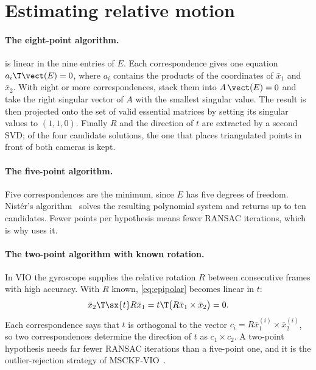 \section{Estimating relative motion}

\paragraph{The eight-point algorithm.}  is linear in the nine entries of $E$. Each correspondence gives
one equation $a_i\T\vect(E) = 0$, where $a_i$ contains the products of the coordinates of $\bar x_1$ and $\bar x_2$. With eight
or more correspondences, stack them into $A\,\vect(E) = 0$ and take the right singular vector of $A$ with the smallest
singular value. The result is then projected onto the set of valid essential matrices by setting its singular values
to $(1, 1, 0)$. Finally $R$ and the direction of $t$ are extracted by a second SVD; of the four candidate solutions, the
one that places triangulated points in front of both cameras is kept.

\paragraph{The five-point algorithm.} Five correspondences are the minimum, since $E$ has five degrees of freedom.
Nistér's algorithm~\cite{nister2004five} solves the resulting polynomial system and returns up to ten candidates. Fewer
points per hypothesis means fewer RANSAC iterations, which is why  uses it.

\paragraph{The two-point algorithm with known rotation.} In VIO the gyroscope supplies the relative rotation $R$ between
consecutive frames with high accuracy. With $R$ known, \eqref{eq:epipolar} becomes linear in $t$:
\begin{equation}
  \bar x_2\T\sx{t}R\bar x_1 = t\T\big(R\bar x_1\times\bar x_2\big) = 0 .
\end{equation}
Each correspondence says that $t$ is orthogonal to the vector $c_i = R\bar x_1^{(i)}\times\bar x_2^{(i)}$, so two correspondences
determine the direction of $t$ as $c_1\times c_2$. A two-point hypothesis needs far fewer RANSAC iterations than a five-point
one, and it is the outlier-rejection strategy of MSCKF-VIO~\cite{sun2018msckfvio}.

